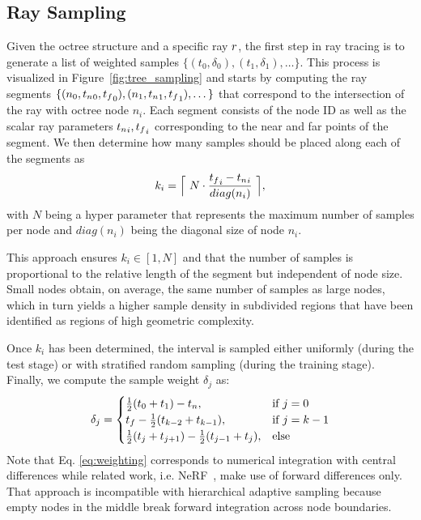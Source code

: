 \documentclass[acmtog,nonacm]{acmart} \acmSubmissionID{0438}
\begin{document}
\subsection{Ray Sampling}
\label{sec:sampling}
Given the octree structure and a specific ray $r$, the first step
in ray tracing is to generate a list of weighted samples
$\{(t_0,\delta_0), (t_1,\delta_1), \dots\}$.  This process is
visualized in Figure~\ref{fig:tree_sampling} and starts by computing
the ray segments $\{(n_0,{t_n}_0,{t_f}_0), (n_1,{t_n}_1,{t_f}_1), \dots\}$
that correspond to the intersection of the ray with octree node
$n_i$. Each segment consists of the node ID as well as the scalar ray
parameters ${t_n}_i, {t_f}_i$ corresponding to the near and far points of
the segment. We then determine how many samples should be placed along
each of the segments as
\begin{equation}
k_i = \Bigl\lceil \ N \cdot \frac{{t_f}_i-{t_n}_i}{diag(n_i)} \ \Bigr\rceil,
\end{equation}
with $N$ being a hyper parameter that represents the maximum number of
samples per node and $diag(n_i)$ being the diagonal size of node $n_i$.

This approach ensures $k_i \in [1,N]$ and that the number of samples is proportional to the relative length of the segment but independent of node size.
Small nodes obtain, on average, the same number of samples as large nodes, which in turn yields a higher sample density in subdivided regions that have been identified as regions of high geometric complexity.

Once $k_i$ has been determined, the interval is sampled either uniformly
(during the test stage) or with stratified random sampling (during the
training stage).  Finally, we compute the sample weight $\delta_j$ as:
\begin{equation}
\delta_j= 
\begin{cases}
    \frac{1}{2}(t_0+t_1) - {t_n},& \text{if }j=0\\
    {t_f} -  \frac{1}{2}(t_{k-2}+t_{k-1}) ,& \text{if }j=k-1\\
    \frac{1}{2}(t_j+t_{j+1}) - \frac{1}{2}(t_{j-1}+t_j),              & \text{else}
\end{cases}
\label{eq:weighting}
\end{equation}
Note that Eq. \eqref{eq:weighting} corresponds to numerical integration with central differences while related work, i.e. NeRF~\cite{mildenhall2020nerf}, make use of forward differences only. 
That approach is incompatible with hierarchical adaptive sampling because empty nodes in the middle break forward integration across node boundaries.
\end{document}
